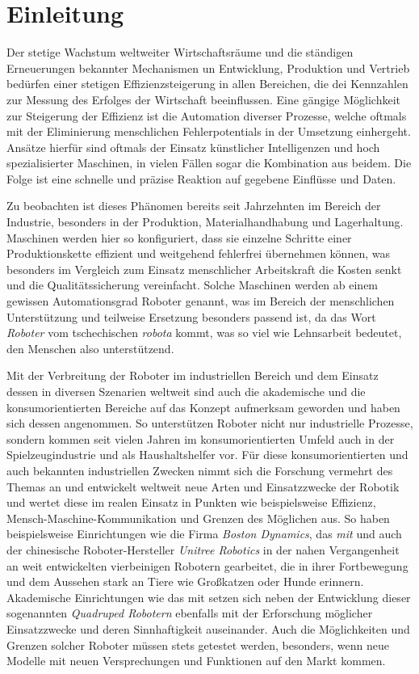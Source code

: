 \section{Einleitung}
\label{sec:einleitung}

Der stetige Wachstum weltweiter Wirtschaftsräume und die ständigen Erneuerungen bekannter Mechanismen un Entwicklung,
Produktion und Vertrieb bedürfen einer stetigen Effizienzsteigerung in allen Bereichen, die dei Kennzahlen zur Messung
des Erfolges der Wirtschaft beeinflussen.
Eine gängige Möglichkeit zur Steigerung der Effizienz ist die Automation diverser Prozesse, welche oftmals mit der Eliminierung
menschlichen Fehlerpotentials in der Umsetzung einhergeht.
Ansätze hierfür sind oftmals der Einsatz künstlicher Intelligenzen und hoch spezialisierter Maschinen, in vielen Fällen
sogar die Kombination aus beidem.
Die Folge ist eine schnelle und präzise Reaktion auf gegebene Einflüsse und Daten.

Zu beobachten ist dieses Phänomen bereits seit Jahrzehnten im Bereich der Industrie, besonders in der Produktion,
Materialhandhabung und Lagerhaltung.
Maschinen werden hier so konfiguriert, dass sie einzelne Schritte einer Produktionskette effizient und weitgehend fehlerfrei
übernehmen können, was besonders im Vergleich zum Einsatz menschlicher Arbeitskraft die Kosten senkt und die Qualitätssicherung
vereinfacht.
Solche Maschinen werden ab einem gewissen Automationsgrad Roboter genannt, was im Bereich der menschlichen Unterstützung
und teilweise Ersetzung besonders passend ist, da das Wort \emph{Roboter} vom tschechischen \emph{robota} kommt, was so viel wie
Lehnsarbeit bedeutet, den Menschen also unterstützend.

Mit der Verbreitung der Roboter im industriellen Bereich und dem Einsatz dessen in diversen Szenarien weltweit sind
auch die akademische und die konsumorientierten Bereiche auf das Konzept aufmerksam geworden und haben sich dessen angenommen.
So unterstützen Roboter nicht nur industrielle Prozesse, sondern kommen seit vielen Jahren im konsumorientierten
Umfeld auch in der Spielzeugindustrie und als Haushaltshelfer vor.
Für diese konsumorientierten und auch bekannten industriellen Zwecken nimmt sich die Forschung vermehrt des Themas an und
entwickelt weltweit neue Arten und Einsatzzwecke der Robotik und wertet diese im realen Einsatz in Punkten wie beispielsweise
Effizienz, Mensch-Maschine-Kommunikation und Grenzen des Möglichen aus.
So haben beispielsweise Einrichtungen wie die Firma \emph{Boston Dynamics}, das \emph{\gls{mit}} und auch der chinesische
Roboter-Hersteller \emph{Unitree Robotics} in der nahen Vergangenheit an weit entwickelten vierbeinigen Robotern
gearbeitet, die in ihrer Fortbewegung und dem Aussehen stark an Tiere wie Großkatzen oder Hunde erinnern.
Akademische Einrichtungen wie das \gls{mit} setzen sich neben der Entwicklung dieser sogenannten \emph{Quadruped Robotern}
ebenfalls mit der Erforschung möglicher Einsatzzwecke und deren Sinnhaftigkeit auseinander.
Auch die Möglichkeiten und Grenzen solcher Roboter müssen stets getestet werden, besonders, wenn neue Modelle mit neuen
Versprechungen und Funktionen auf den Markt kommen.

